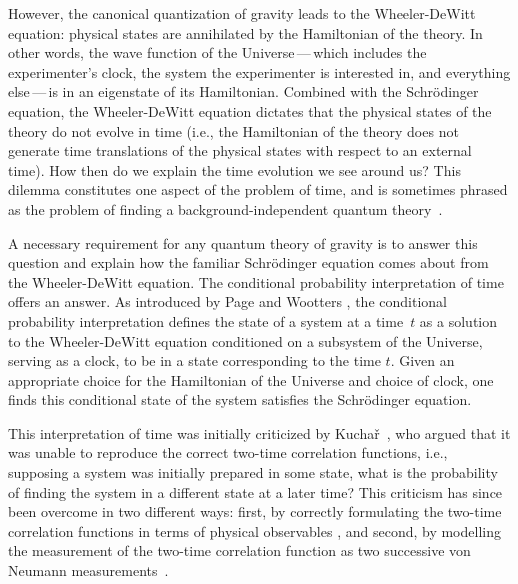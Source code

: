 \documentclass[a4paper,twocolumn,superscriptaddress,11pt,accepted=2019-06-04]{quantumarticle}
\begin{document}
However, the canonical quantization of gravity leads to the Wheeler-DeWitt equation: physical states are annihilated by the Hamiltonian of the theory. In other words, the wave function of the Universe\,---\,which includes the experimenter's clock, the system the experimenter is interested in, and everything else\,---\,is in {an eigenstate} of its Hamiltonian. Combined with the Schr\"{o}dinger equation, the Wheeler-DeWitt equation dictates that the physical states of the theory do not evolve in time {(i.e., the Hamiltonian of the theory does not generate time translations of the physical states with respect to an external time)}. How then do we explain the time evolution we see around us? This dilemma constitutes one aspect of the problem of time, and is sometimes phrased as the problem of finding a background-independent quantum theory~\cite{Isham1993, Kuchar:2011}.

A necessary requirement for any quantum theory of gravity is to answer this question and explain how the familiar Schr\"{o}dinger equation comes about from the Wheeler-DeWitt equation. The conditional probability interpretation of time offers an answer. As introduced by {Page and Wootters} \cite{Page:1983, Wootters:1984, Page:1989br, Page1994}, the conditional probability interpretation defines the state of a system at a time~$t$ as a solution to the Wheeler-DeWitt equation conditioned on a subsystem of the Universe, serving as a clock, to be in a state corresponding to the time $t$. Given an appropriate choice for the Hamiltonian of the Universe and choice of clock, one finds this conditional state of the system satisfies the Schr\"{o}dinger equation.


This interpretation of time was initially criticized by Kucha\v{r}~\cite{Page1994, Kuchar:2011}, who argued that it was unable to reproduce the correct two-time correlation functions, i.e., supposing a system was initially prepared in some state, what is the probability of finding the system in a different state at a later time? This criticism has since been overcome in two different ways: first, by correctly formulating the two-time correlation functions in terms of physical observables \cite{Dolby2004}, and second, by modelling the measurement of the two-time correlation function as two successive von Neumann measurements~\cite{Giovannetti:2015}.
\end{document}

